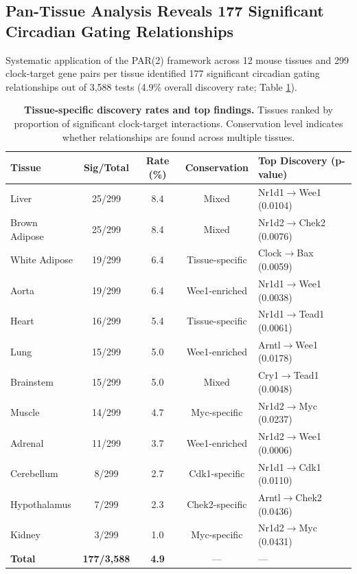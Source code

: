 \documentclass[11pt,letterpaper]{article}
\begin{document}
\subsection{Pan-Tissue Analysis Reveals 177 Significant Circadian Gating Relationships}

Systematic application of the PAR(2) framework across 12 mouse tissues and 299 clock-target gene pairs per tissue identified 177 significant circadian gating relationships out of 3,588 tests (4.9\% overall discovery rate; Table \ref{tab:tissue_summary}).

\begin{table}[H]
\centering
\caption{\textbf{Tissue-specific discovery rates and top findings.} Tissues ranked by proportion of significant clock-target interactions. Conservation level indicates whether relationships are found across multiple tissues.}
\label{tab:tissue_summary}
\begin{tabular}{lcccl}
\toprule
\textbf{Tissue} & \textbf{Sig/Total} & \textbf{Rate (\%)} & \textbf{Conservation} & \textbf{Top Discovery (p-value)} \\
\midrule
Liver & 25/299 & 8.4 & Mixed & Nr1d1$\rightarrow$Wee1 (0.0104) \\
Brown Adipose & 25/299 & 8.4 & Mixed & Nr1d2$\rightarrow$Chek2 (0.0076) \\
White Adipose & 19/299 & 6.4 & Tissue-specific & Clock$\rightarrow$Bax (0.0059) \\
Aorta & 19/299 & 6.4 & Wee1-enriched & Nr1d1$\rightarrow$Wee1 (0.0038) \\
Heart & 16/299 & 5.4 & Tissue-specific & Nr1d1$\rightarrow$Tead1 (0.0061) \\
Lung & 15/299 & 5.0 & Wee1-enriched & Arntl$\rightarrow$Wee1 (0.0178) \\
Brainstem & 15/299 & 5.0 & Mixed & Cry1$\rightarrow$Tead1 (0.0048) \\
Muscle & 14/299 & 4.7 & Myc-specific & Nr1d2$\rightarrow$Myc (0.0237) \\
Adrenal & 11/299 & 3.7 & Wee1-enriched & Nr1d2$\rightarrow$Wee1 (0.0006) \\
Cerebellum & 8/299 & 2.7 & Cdk1-specific & Nr1d1$\rightarrow$Cdk1 (0.0110) \\
Hypothalamus & 7/299 & 2.3 & Chek2-specific & Arntl$\rightarrow$Chek2 (0.0436) \\
Kidney & 3/299 & 1.0 & Myc-specific & Nr1d2$\rightarrow$Myc (0.0431) \\
\midrule
\textbf{Total} & \textbf{177/3,588} & \textbf{4.9} & --- & --- \\
\bottomrule
\end{tabular}
\end{table}
\end{document}
